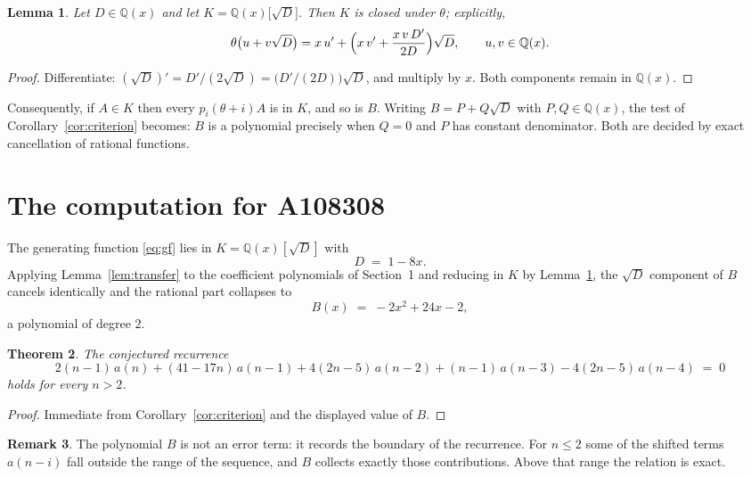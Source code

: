 \documentclass[11pt,a4paper]{article}
\theoremstyle{plain}
\newtheorem{theorem}{Theorem}
\newtheorem{lemma}[theorem]{Lemma}
\theoremstyle{definition}
\newtheorem{remark}[theorem]{Remark}
\begin{document}
\begin{lemma}\label{lem:field}
Let $D\in\mathbb{Q}(x)$ and let $K=\mathbb{Q}(x)\bigl[\sqrt{D}\bigr]$. Then $K$ is closed
under $\theta$; explicitly,
\[
\theta\bigl(u+v\sqrt{D}\bigr)=x\,u'+\Bigl(x\,v'+\frac{x\,v\,D'}{2D}\Bigr)\sqrt{D},
\qquad u,v\in\mathbb{Q}(x).
\]
\end{lemma}

\begin{proof}
Differentiate: $(\sqrt{D})'=D'/(2\sqrt{D})=\bigl(D'/(2D)\bigr)\sqrt{D}$, and multiply by
$x$. Both components remain in $\mathbb{Q}(x)$.
\end{proof}

Consequently, if $A\in K$ then every $p_{i}(\theta+i)A$ is in $K$, and so is $B$. Writing
$B=P+Q\sqrt{D}$ with $P,Q\in\mathbb{Q}(x)$, the test of Corollary~\ref{cor:criterion}
becomes: $B$ is a polynomial precisely when $Q=0$ and $P$ has constant denominator. Both
are decided by exact cancellation of rational functions.

\section{The computation for A108308}

The generating function \eqref{eq:gf} lies in $K=\mathbb{Q}(x)[\sqrt{D}]$ with
\[
D \;=\; 1 - 8 x .
\]
Applying Lemma~\ref{lem:transfer} to the coefficient polynomials of Section~1 and reducing
in $K$ by Lemma~\ref{lem:field}, the $\sqrt{D}$ component of $B$ cancels identically and
the rational part collapses to
\[
B(x)\;=\;- 2 x^{2} + 24 x - 2 ,
\]
a polynomial of degree $2$.

\begin{theorem}
The conjectured recurrence
\[
2 \left(n - 1\right)\,a(n) + (41 - 17 n)\,a(n-1) + 4 \left(2 n - 5\right)\,a(n-2) + (n - 1)\,a(n-3) -  4 \left(2 n - 5\right)\,a(n-4) \;=\;0
\]
holds for every $n>2$.
\end{theorem}

\begin{proof}
Immediate from Corollary~\ref{cor:criterion} and the displayed value of $B$.
\end{proof}

\begin{remark}
The polynomial $B$ is not an error term: it records the boundary of the recurrence. For
$n\le2$ some of the shifted terms $a(n-i)$ fall outside the range of the sequence,
and $B$ collects exactly those contributions. Above that range the relation is exact.
\end{remark}
\end{document}
